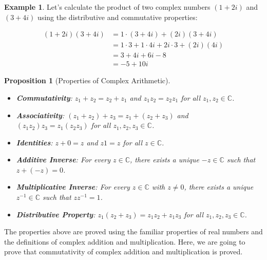 \documentclass[
]{book}
\providecommand{\tightlist}{%
  \setlength{\itemsep}{0pt}\setlength{\parskip}{0pt}}
\newtheorem{proposition}{Proposition}[chapter]
\theoremstyle{definition}
\theoremstyle{definition}
\newtheorem{example}{Example}[chapter]
\theoremstyle{definition}
\theoremstyle{definition}
\theoremstyle{remark}
\begin{document}
\begin{example}
\protect\hypertarget{exm:unnamed-chunk-2}{}\label{exm:unnamed-chunk-2}Let's calculate the product of two complex numbers \((1 + 2i)\) and \((3 + 4i)\) using the distributive and commutative properties:

\begin{align*}
(1 + 2i)(3 + 4i) &= 1 \cdot (3 + 4i) + (2i)(3 + 4i) \\
&= 1 \cdot 3 + 1 \cdot 4i + 2i \cdot 3 + (2i)(4i) \\
&= 3 + 4i + 6i - 8 \\
&= -5 + 10i
\end{align*}
\end{example}

\begin{proposition}[Properties of Complex Arithmetic]
\protect\hypertarget{prp:unnamed-chunk-3}{}\label{prp:unnamed-chunk-3}\leavevmode

\begin{itemize}
\tightlist
\item
  \textbf{Commutativity}: \(z_1 + z_2 = z_2 + z_1\) and \(z_1z_2 = z_2z_1\) for all \(z_1, z_2 \in \mathbb{C}\).
\item
  \textbf{Associativity}: \((z_1 + z_2) + z_3 = z_1 + (z_2 + z_3)\) and \((z_1z_2)z_3 = z_1(z_2z_3)\) for all \(z_1, z_2, z_3 \in \mathbb{C}\).
\item
  \textbf{Identities}: \(z + 0 = z\) and \(z1 = z\) for all \(z \in \mathbb{C}\).
\item
  \textbf{Additive Inverse}: For every \(z \in \mathbb{C}\), there exists a unique \(-z \in \mathbb{C}\) such that \(z + (-z) = 0\).
\item
  \textbf{Multiplicative Inverse}: For every \(z \in \mathbb{C}\) with \(z \neq 0\), there exists a unique \(z^{-1} \in \mathbb{C}\) such that \(zz^{-1} = 1\).
\item
  \textbf{Distributive Property}: \(z_1(z_2 + z_3) = z_1z_2 + z_1z_3\) for all \(z_1, z_2, z_3 \in \mathbb{C}\).
\end{itemize}

\end{proposition}

The properties above are proved using the familiar properties of real numbers and the definitions of complex addition and multiplication. Here, we are going to prove that commutativity of complex addition and multiplication is proved.
\end{document}
